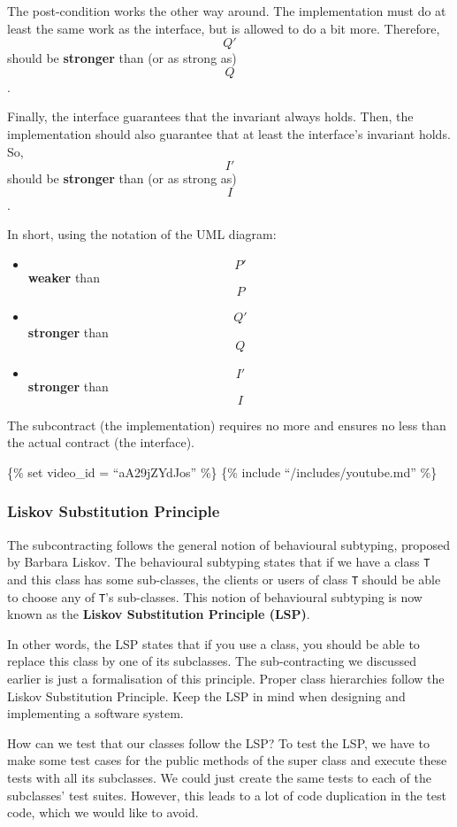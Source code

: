 The post-condition works the other way around. The implementation must
do at least the same work as the interface, but is allowed to do a bit
more. Therefore, \[Q'\] should be \textbf{stronger} than (or as strong
as) \[Q\].

Finally, the interface guarantees that the invariant always holds. Then,
the implementation should also guarantee that at least the interface's
invariant holds. So, \[I'\] should be \textbf{stronger} than (or as
strong as) \[I\].

In short, using the notation of the UML diagram:

\begin{itemize}
\tightlist
\item
  \[P'\] \textbf{weaker} than \[P\]
\item
  \[Q'\] \textbf{stronger} than \[Q\]
\item
  \[I'\] \textbf{stronger} than \[I\]
\end{itemize}

The subcontract (the implementation) requires no more and ensures no
less than the actual contract (the interface).

\{\% set video\_id = ``aA29jZYdJos'' \%\} \{\% include
``/includes/youtube.md'' \%\}

\hypertarget{liskov-substitution-principle}{%
\subsubsection{Liskov Substitution
Principle}\label{liskov-substitution-principle}}

The subcontracting follows the general notion of behavioural subtyping,
proposed by Barbara Liskov. The behavioural subtyping states that if we
have a class \texttt{T} and this class has some sub-classes, the clients
or users of class \texttt{T} should be able to choose any of
\texttt{T}'s sub-classes. This notion of behavioural subtyping is now
known as the \textbf{Liskov Substitution Principle (LSP)}.

In other words, the LSP states that if you use a class, you should be
able to replace this class by one of its subclasses. The sub-contracting
we discussed earlier is just a formalisation of this principle. Proper
class hierarchies follow the Liskov Substitution Principle. Keep the LSP
in mind when designing and implementing a software system.

How can we test that our classes follow the LSP? To test the LSP, we
have to make some test cases for the public methods of the super class
and execute these tests with all its subclasses. We could just create
the same tests to each of the subclasses' test suites. However, this
leads to a lot of code duplication in the test code, which we would like
to avoid.


